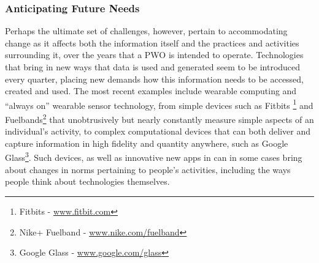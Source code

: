 \documentclass{sig-alternate}
\begin{document}

\subsubsection{Anticipating Future Needs}
Perhaps the ultimate set of challenges, however, pertain to accommodating change as it affects both the information itself and the practices and activities surrounding it, over the years that a PWO is intended to operate.  Technologies that bring in new ways that data is used and generated seem to be introduced every quarter, placing new demands how this information needs to be accessed, created and used.  The most recent examples include wearable computing and ``always on'' wearable sensor technology, from simple devices such as Fitbits \footnote{Fitbits - \url{www.fitbit.com}} and Fuelbands\footnote{Nike+ Fuelband - \url{www.nike.com/fuelband}} that unobtrusively but nearly constantly measure simple aspects of an individual's activity, to complex computational devices that can both deliver and capture information in high fidelity and quantity anywhere, such as Google Glass\footnote{Google Glass - \url{www.google.com/glass}}.  Such devices, as well as innovative new apps in can in some cases bring about changes in norms pertaining to people's activities, including the ways people think about technologies themselves.

\end{document}
